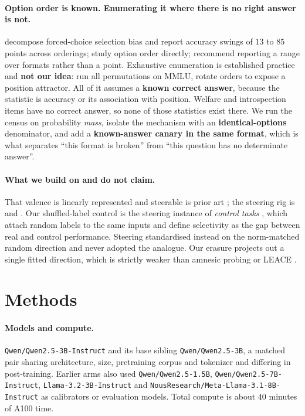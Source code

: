 \documentclass{article}
\begin{document}
\paragraph{Option order is known. Enumerating it where there is no right answer is not.}
\citet{zheng2024} decompose forced-choice selection bias and report accuracy swings of $13$ to $85$
points across orderings; \citet{pezeshkpour2024} study option order directly; \citet{sclar2024}
recommend reporting a range over formats rather than a point. Exhaustive enumeration is established
practice and \textbf{not our idea}: \citet{tamba2026} run all permutations on MMLU,
\citet{cacioli2026} rotate orders to expose a position attractor. All of it assumes a \textbf{known
correct answer}, because the statistic is accuracy or its association with position. Welfare and
introspection items have no correct answer, so none of those statistics exist there. We run the
census on probability \emph{mass}, isolate the mechanism with an \textbf{identical-options}
denominator, and add a \textbf{known-answer canary in the same format}, which is what separates
``this format is broken'' from ``this question has no determinate answer''.

\paragraph{What we build on and do not claim.} That valence is linearly represented and steerable
is prior art \citep{sofroniew2026, zou2023}; the steering rig is \citet{turner2023} and
\citet{rimsky2023}. Our shuffled-label control is the steering instance of \emph{control tasks}
\citep{hewitt2019}, which attach random labels to the same inputs and define selectivity as the gap
between real and control performance. Steering standardised instead on the norm-matched random
direction and never adopted the analogue. Our erasure projects out a single fitted direction, which
is strictly weaker than amnesic probing \citep{elazar2021} or LEACE \citep{belrose2023}.

\section{Methods}
\label{sec:methods}

\paragraph{Models and compute.} \texttt{Qwen/Qwen2.5-3B-Instruct} and its base sibling
\texttt{Qwen/Qwen2.5-3B}, a matched pair sharing architecture, size, pretraining corpus and
tokenizer and differing in post-training. Earlier arms also used \texttt{Qwen/Qwen2.5-1.5B},
\texttt{Qwen/Qwen2.5-7B-Instruct}, \texttt{Llama-3.2-3B-Instruct} and
\texttt{NousResearch/Meta-Llama-3.1-8B-Instruct} as calibrators or evaluation models. Total
compute is about $40$ minutes of A100 time.
\end{document}
